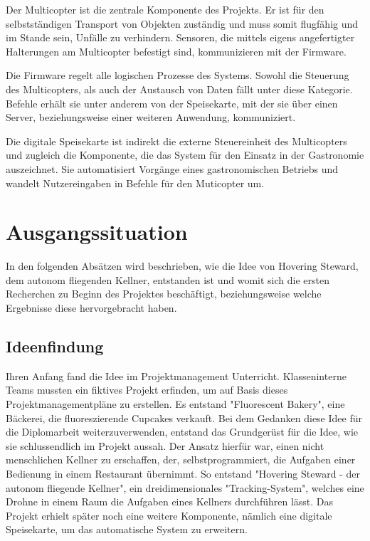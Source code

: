 Der Multicopter ist die zentrale Komponente des Projekts. Er ist für den selbstständigen Transport von Objekten zuständig
und muss somit flugfähig und im Stande sein, Unfälle zu verhindern. Sensoren, die mittels eigens angefertigter Halterungen
am Multicopter befestigt sind, kommunizieren mit der Firmware.

Die Firmware regelt alle logischen Prozesse des Systems. Sowohl die Steuerung des Multicopters, als auch der
Austausch von Daten fällt unter diese Kategorie. Befehle erhält sie unter anderem von der Speisekarte, mit der sie über
einen Server, beziehungsweise einer weiteren Anwendung, kommuniziert.

Die digitale Speisekarte ist indirekt die externe Steuereinheit des Multicopters und zugleich die Komponente,
die das System für den Einsatz in der Gastronomie auszeichnet. Sie automatisiert Vorgänge eines gastronomischen
Betriebs und wandelt Nutzereingaben in Befehle für den Muticopter um.

\section{Ausgangssituation}
  In den folgenden Absätzen wird beschrieben, wie die Idee von Hovering Steward, dem autonom fliegenden Kellner,
  entstanden ist und womit sich die ersten Recherchen zu Beginn des Projektes beschäftigt, beziehungsweise
  welche Ergebnisse diese hervorgebracht haben.

  \subsection{Ideenfindung}
  Ihren Anfang fand die Idee im Projektmanagement Unterricht. Klasseninterne Teams mussten ein fiktives Projekt erfinden, um auf Basis dieses
  Projektmanagementpläne zu erstellen. Es entstand "Fluorescent Bakery", eine Bäckerei, die fluoreszierende Cupcakes verkauft.
  Bei dem Gedanken diese Idee für die Diplomarbeit weiterzuverwenden, entstand das Grundgerüst für die Idee, wie sie schlussendlich im Projekt aussah. Der Ansatz hierfür war,
  einen nicht menschlichen Kellner zu erschaffen, der, selbstprogrammiert, die Aufgaben einer Bedienung in einem Restaurant übernimmt.
  So entstand "Hovering Steward - der autonom fliegende Kellner", ein dreidimensionales "Tracking-System", welches eine Drohne in einem Raum die Aufgaben eines Kellners durchführen lässt.
  Das Projekt erhielt später noch eine weitere Komponente, nämlich eine digitale Speisekarte, um das automatische System zu erweitern.

